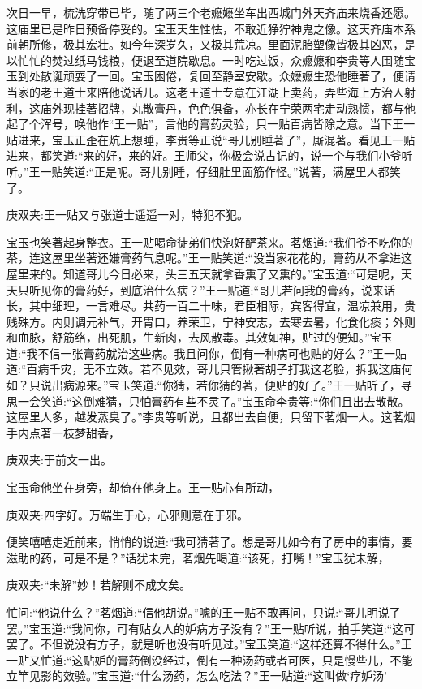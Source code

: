 \begin{parag}
    次日一早，梳洗穿带已毕，随了两三个老嬷嬷坐车出西城门外天齐庙来烧香还愿。这庙里已是昨日预备停妥的。宝玉天生性怯，不敢近狰狞神鬼之像。这天齐庙本系前朝所修，极其宏壮。如今年深岁久，又极其荒凉。里面泥胎塑像皆极其凶恶，是以忙忙的焚过纸马钱粮，便退至道院歇息。一时吃过饭，众嬷嬷和李贵等人围随宝玉到处散诞顽耍了一回。宝玉困倦，复回至静室安歇。众嬷嬷生恐他睡著了，便请当家的老王道士来陪他说话儿。这老王道士专意在江湖上卖药，弄些海上方治人射利，这庙外现挂著招牌，丸散膏丹，色色俱备，亦长在宁荣两宅走动熟惯，都与他起了个浑号，唤他作“王一贴”，言他的膏药灵验，只一贴百病皆除之意。当下王一贴进来，宝玉正歪在炕上想睡，李贵等正说“哥儿别睡著了”，厮混著。看见王一贴进来，都笑道:“来的好，来的好。王师父，你极会说古记的，说一个与我们小爷听听。”王一贴笑道:“正是呢。哥儿别睡，仔细肚里面筋作怪。”说著，满屋里人都笑了。\begin{note}庚双夹:王一贴又与张道士遥遥一对，特犯不犯。\end{note}宝玉也笑著起身整衣。王一贴喝命徒弟们快泡好酽茶来。茗烟道:“我们爷不吃你的茶，连这屋里坐著还嫌膏药气息呢。”王一贴笑道:“没当家花花的，膏药从不拿进这屋里来的。知道哥儿今日必来，头三五天就拿香熏了又熏的。”宝玉道:“可是呢，天天只听见你的膏药好，到底治什么病？”王一贴道:“哥儿若问我的膏药，说来话长，其中细理，一言难尽。共药一百二十味，君臣相际，宾客得宜，温凉兼用，贵贱殊方。内则调元补气，开胃口，养荣卫，宁神安志，去寒去暑，化食化痰；外则和血脉，舒筋络，出死肌，生新肉，去风散毒。其效如神，贴过的便知。”宝玉道:“我不信一张膏药就治这些病。我且问你，倒有一种病可也贴的好么？”王一贴道:“百病千灾，无不立效。若不见效，哥儿只管揪著胡子打我这老脸，拆我这庙何如？只说出病源来。”宝玉笑道:“你猜，若你猜的著，便贴的好了。”王一贴听了，寻思一会笑道:“这倒难猜，只怕膏药有些不灵了。”宝玉命李贵等:“你们且出去散散。这屋里人多，越发蒸臭了。”李贵等听说，且都出去自便，只留下茗烟一人。这茗烟手内点著一枝梦甜香，\begin{note}庚双夹:于前文一出。\end{note}宝玉命他坐在身旁，却倚在他身上。王一贴心有所动，\begin{note}庚双夹:四字好。万端生于心，心邪则意在于邪。\end{note}便笑嘻嘻走近前来，悄悄的说道:“我可猜著了。想是哥儿如今有了房中的事情，要滋助的药，可是不是？”话犹未完，茗烟先喝道:“该死，打嘴！”宝玉犹未解，\begin{note}庚双夹:“未解”妙！若解则不成文矣。\end{note}忙问:“他说什么？”茗烟道:“信他胡说。”唬的王一贴不敢再问，只说:“哥儿明说了罢。”宝玉道:“我问你，可有贴女人的妒病方子没有？”王一贴听说，拍手笑道:“这可罢了。不但说没有方子，就是听也没有听见过。”宝玉笑道:“这样还算不得什么。”王一贴又忙道:“这贴妒的膏药倒没经过，倒有一种汤药或者可医，只是慢些儿，不能立竿见影的效验。”宝玉道:“什么汤药，怎么吃法？”王一贴道:“这叫做‘疗妒汤’
\end{parag}
